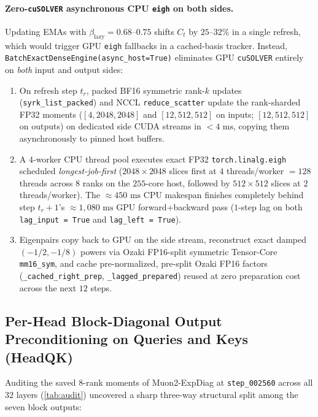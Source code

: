 \documentclass[11pt]{article}
\newcommand{\mname}[1]{#1}
\begin{document}
\paragraph{Zero-\texttt{cuSOLVER} asynchronous CPU \texttt{eigh} on both sides.}
Updating EMAs with $\beta_{\mathrm{lazy}} = 0.68\text{--}0.75$ shifts $C_t$ by $25\text{--}32\%$ in a single refresh, which would trigger GPU \texttt{eigh} fallbacks in a cached-basis tracker. Instead, \texttt{BatchExactDenseEngine(async\_host=True)} eliminates GPU \texttt{cuSOLVER} entirely on \emph{both} input and output sides:
\begin{enumerate}
  \item On refresh step $t_r$, packed BF16 symmetric rank-$k$ updates (\texttt{syrk\_list\_packed}) and NCCL \texttt{reduce\_scatter} update the rank-sharded FP32 moments ($[4, 2048, 2048]$ and $[12, 512, 512]$ on inputs; $[12, 512, 512]$ on outputs) on dedicated side CUDA streams in $<4\text{ ms}$, copying them asynchronously to pinned host buffers.
  \item A $4$-worker CPU thread pool executes exact FP32 \texttt{torch.linalg.eigh} scheduled \emph{longest-job-first} ($2048\times 2048$ slices first at $4$ threads/worker $= 128$ threads across $8$ ranks on the $255$-core host, followed by $512\times 512$ slices at $2$ threads/worker). The $\approx 450\text{ ms}$ CPU makespan finishes completely behind step $t_r + 1$'s $\approx 1{,}080\text{ ms}$ GPU forward+backward pass ($1$-step lag on both \texttt{lag\_input = True} and \texttt{lag\_left = True}).
  \item Eigenpairs copy back to GPU on the side stream, reconstruct exact damped $(-1/2, -1/8)$ powers via Ozaki FP16-split symmetric Tensor-Core \texttt{mm16\_sym}, and cache pre-normalized, pre-split Ozaki FP16 factors (\texttt{\_cached\_right\_prep}, \texttt{\_lagged\_prepared}) reused at zero preparation cost across the next $12$ steps.
\end{enumerate}

\subsection{Per-Head Block-Diagonal Output Preconditioning on Queries and Keys (\mname{HeadQK})}
\label{sec:headqk}

Auditing the saved 8-rank moments of \mname{Muon2-ExpDiag} at \texttt{step\_002560} across all $32$ layers (\cref{tab:audit}) uncovered a sharp three-way structural split among the seven block outputs:
\end{document}
